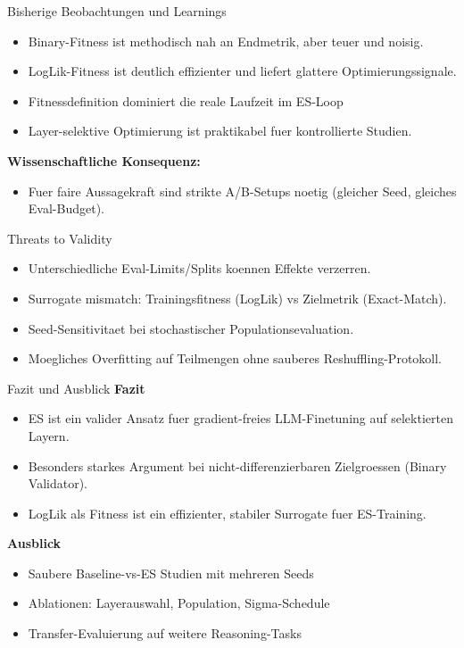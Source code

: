 \documentclass[aspectratio=169,11pt]{beamer}
\begin{document}
\begin{frame}{Bisherige Beobachtungen und Learnings}
\begin{itemize}
  \item Binary-Fitness ist methodisch nah an Endmetrik, aber teuer und noisig.
  \item LogLik-Fitness ist deutlich effizienter und liefert glattere Optimierungssignale.
  \item Fitnessdefinition dominiert die reale Laufzeit im ES-Loop
  \item Layer-selektive Optimierung ist praktikabel fuer kontrollierte Studien.
\end{itemize}

\vspace{0.4em}
\textbf{Wissenschaftliche Konsequenz:}
\begin{itemize}
  \item Fuer faire Aussagekraft sind strikte A/B-Setups noetig (gleicher Seed, gleiches Eval-Budget).
\end{itemize}
\end{frame}

\begin{frame}{Threats to Validity}
\begin{itemize}
  \item Unterschiedliche Eval-Limits/Splits koennen Effekte verzerren.
  \item Surrogate mismatch: Trainingsfitness (LogLik) vs Zielmetrik (Exact-Match).
  \item Seed-Sensitivitaet bei stochastischer Populationsevaluation.
  \item Moegliches Overfitting auf Teilmengen ohne sauberes Reshuffling-Protokoll.
\end{itemize}
\end{frame}

\begin{frame}{Fazit und Ausblick}
\textbf{Fazit}
\begin{itemize}
  \item ES ist ein valider Ansatz fuer gradient-freies LLM-Finetuning auf selektierten Layern.
  \item Besonders starkes Argument bei nicht-differenzierbaren Zielgroessen (Binary Validator).
  \item LogLik als Fitness ist ein effizienter, stabiler Surrogate fuer ES-Training.
\end{itemize}

\textbf{Ausblick}
\begin{itemize}
  \item Saubere Baseline-vs-ES Studien mit mehreren Seeds
  \item Ablationen: Layerauswahl, Population, Sigma-Schedule
  \item Transfer-Evaluierung auf weitere Reasoning-Tasks
\end{itemize}
\end{frame}
\end{document}
